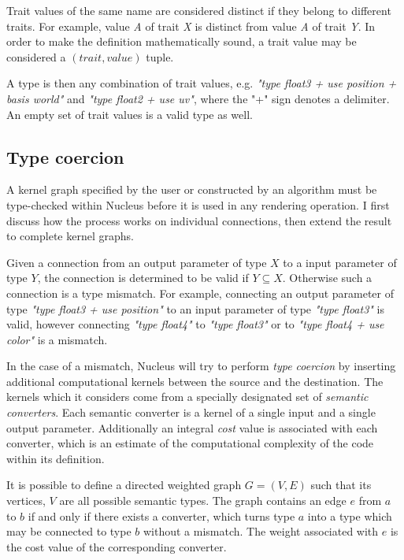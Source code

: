 Trait values of the same name are considered distinct if they belong to different traits. For example, value \emph{A} of trait \emph{X} is distinct from value \emph{A} of trait \emph{Y}. In order to make the definition mathematically sound, a trait value may be considered a $(trait, value)$ tuple.

A type is then any combination of trait values, e.g. \emph{"type float3 + use position + basis world"} and \emph{"type float2 + use uv"}, where the "+" sign denotes a delimiter. An empty set of trait values is a valid type as well.

\subsection{Type coercion}

A kernel graph specified by the user or constructed by an algorithm must be type-checked within Nucleus before it is used in any rendering operation. I first discuss how the process works on individual connections, then extend the result to complete kernel graphs.

Given a connection from an output parameter of type $X$ to a input parameter of type $Y$, the connection is determined to be valid if $Y \subseteq X$. Otherwise such a connection is a type mismatch. For example, connecting an output parameter of type \emph{"type float3 + use position"} to an input parameter of type \emph{"type float3"} is valid, however connecting \emph{"type float4"} to \emph{"type float3"} or to \emph{"type float4 + use color"} is a mismatch.

In the case of a mismatch, Nucleus will try to perform \emph{type coercion} by inserting additional computational kernels between the source and the destination. The kernels which it considers come from a specially designated set of \emph{semantic converters}. Each semantic converter is a kernel of a single input and a single output parameter. Additionally an integral \emph{cost} value is associated with each converter, which is an estimate of the computational complexity of the code within its definition.

It is possible to define a directed weighted graph $G=(V, E)$ such that its vertices, $V$ are all possible semantic types. The graph contains an edge $e$ from $a$ to $b$ if and only if there exists a converter, which turns type $a$ into a type which may be connected to type $b$ without a mismatch. The weight associated with $e$ is the cost value of the corresponding converter.


